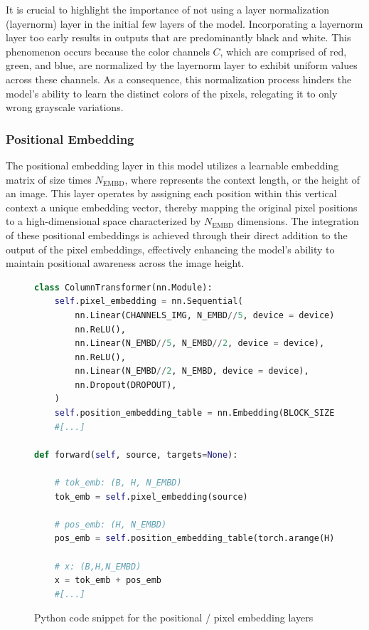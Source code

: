     It is crucial to highlight the importance of not using a layer normalization (layernorm) layer in the initial few layers of the model. Incorporating a layernorm layer too early results in outputs that are predominantly black and white. This phenomenon occurs because the color channels \(C\), which are comprised of red, green, and blue, are normalized by the layernorm layer to exhibit uniform values across these channels. As a consequence, this normalization process hinders the model's ability to learn the distinct colors of the pixels, relegating it to only wrong grayscale variations.

    \subsubsection{Positional Embedding}
    \label{sec:CIT_PositionalEmbedding}

    The positional embedding layer in this model utilizes a learnable embedding matrix of size  times \(N_{\text{EMBD}}\), where  represents the context length, or the height of an image. This layer operates by assigning each position within this vertical context a unique embedding vector, thereby mapping the original pixel positions to a high-dimensional space characterized by \(N_{\text{EMBD}}\) dimensions. The integration of these positional embeddings is achieved through their direct addition to the output of the pixel embeddings, effectively enhancing the model's ability to maintain positional awareness across the image height.


\begin{figure}[H]
    \centering
    \begin{lstlisting}[language=Python]
class ColumnTransformer(nn.Module):
    self.pixel_embedding = nn.Sequential(
        nn.Linear(CHANNELS_IMG, N_EMBD//5, device = device),
        nn.ReLU(),
        nn.Linear(N_EMBD//5, N_EMBD//2, device = device),
        nn.ReLU(),
        nn.Linear(N_EMBD//2, N_EMBD, device = device),
        nn.Dropout(DROPOUT),
    )
    self.position_embedding_table = nn.Embedding(BLOCK_SIZE, N_EMBD)
    #[...]

def forward(self, source, targets=None):

    # tok_emb: (B, H, N_EMBD)
    tok_emb = self.pixel_embedding(source) 

    # pos_emb: (H, N_EMBD)
    pos_emb = self.position_embedding_table(torch.arange(H)) 

    # x: (B,H,N_EMBD)
    x = tok_emb + pos_emb 
    #[...]
\end{lstlisting}
\caption{Python code snippet for the positional / pixel embedding layers}
\label{fig:posEmbend_CIT}
\end{figure}
   
